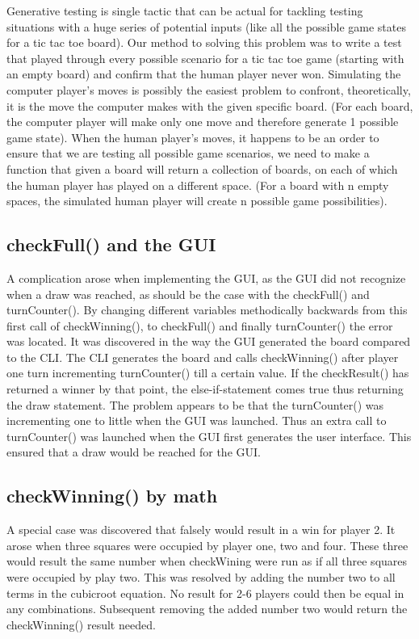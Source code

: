 \documentclass[a4paper,10pt]{article}
\begin{document}
Generative testing is single tactic that can be actual for tackling testing situations with a huge series of potential inputs (like all the possible game states for a tic tac toe board).
Our method to solving this problem was to write a test that played through every possible scenario for a tic tac toe game (starting with an empty board) and confirm that the human player never won.
Simulating the computer player’s moves is possibly the easiest problem to confront, theoretically, it is the move the computer makes with the given specific board. (For each board, the computer player will make only one move and therefore generate 1 possible game state).
When the human player’s moves, it happens to be an order to ensure that we are testing all possible game scenarios, we need to make a function that given a board will return a collection of boards, on each of which the human player has played on a different space. (For a board with n empty spaces, the simulated human player will create n possible game possibilities).

	\subsection{checkFull() and the GUI}
	A complication arose when implementing the GUI, as the GUI did not recognize when a draw was reached, as should be the case with the checkFull() and turnCounter(). By changing different variables methodically backwards from this first call of checkWinning(), to checkFull() and finally turnCounter() the error was located. It was discovered in the way the GUI generated the board compared to the CLI.  The CLI generates the board and calls checkWinning() after player one turn incrementing turnCounter() till a certain value. If the checkResult() has returned a winner by that point, the else-if-statement comes true thus returning the draw statement.  
	The problem appears to be that the turnCounter() was incrementing one to little when the GUI was launched. Thus an extra call to turnCounter() was launched when the GUI first generates the user interface. This ensured that a draw would be reached for the GUI.
	
	\subsection{checkWinning() by math}
	A special case was discovered that falsely would result in a win for player 2. It arose when three squares were occupied by player one, two and four. These three would result the same number when checkWining were run as if all three squares were occupied by play two.
	This was resolved by adding the number two to all terms in the cubicroot equation. No result for 2-6 players could then be equal in any combinations. Subsequent removing the added number two would return the checkWinning() result needed.
	
\end{document}
